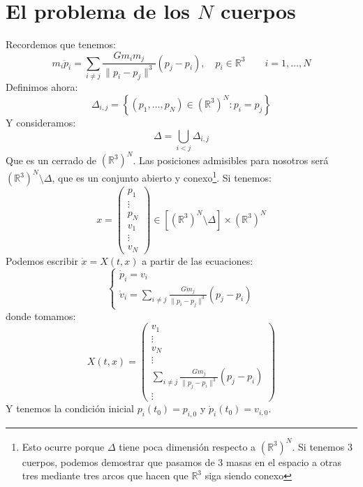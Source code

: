 \section{El problema de los $N$ cuerpos}
\noindent
Recordemos que tenemos:
\begin{equation*}
    m_i \ddot{p}_i = \sum_{i\neq j} \frac{Gm_im_j}{\|p_i-p_j\|^3}(p_j-p_i), \quad p_i \in \mathbb{R}^3 \qquad i = 1,\ldots,N
\end{equation*}
Definimos ahora:
\begin{equation*}
    \Delta_{i,j} = \left\{(p_1,\ldots,p_N)\in {(\mathbb{R}^3)}^{N} : p_i = p_j\right\}
\end{equation*}
Y consideramos:
\begin{equation*}
    \Delta = \bigcup_{i<j} \Delta_{i,j}
\end{equation*}
Que es un cerrado de ${(\mathbb{R}^3)}^{N}$. Las posiciones admisibles para nosotros será ${(\mathbb{R}^3)}^{N}\setminus \Delta$, que es un conjunto abierto y conexo\footnote{Esto ocurre porque $\Delta$ tiene poca dimensión respecto a ${(\mathbb{R}^3)}^{N}$. Si tenemos 3 cuerpos, podemos demostrar que pasamos de 3 masas en el espacio a otras tres mediante tres arcos que hacen que $\mathbb{R}^3$ siga siendo conexo}. Si tenemos:
\begin{equation*}
    x = \left(\begin{array}{ccc}
        p_1 \\
        \vdots \\
        p_N \\
        v_1 \\
        \vdots \\
        v_N
\end{array}\right) \in  [{(\mathbb{R}^3)}^{N}\setminus \Delta] \times {(\mathbb{R}^3)}^{N}
\end{equation*}
Podemos escribir $\dot{x}=X(t,x)$ a partir de las ecuaciones:
\begin{equation}\label{eq:problema_n_cuerpos}
    \left\{\begin{array}{l}
            \dot{p}_i = v_i \\
            \displaystyle \dot{v}_i = \sum_{i\neq j} \frac{G m_j}{\|p_i-p_j\|^3}(p_j-p_i)
    \end{array}\right.
\end{equation}
donde tomamos:
\begin{equation*}
    X(t,x) = \left(\begin{array}{ccc}
        v_1 \\
        \vdots \\
        v_N \\
        \vdots \\
        \displaystyle \sum_{i\neq j} \frac{Gm_j}{\|p_j-p_i\|^3}(p_j-p_i) \\
        \vdots 
    \end{array}\right)
\end{equation*}
Y tenemos la condición inicial $p_i(t_0) = p_{i,0}$ y $\dot{p}_i(t_0) = v_{i,0}$.

